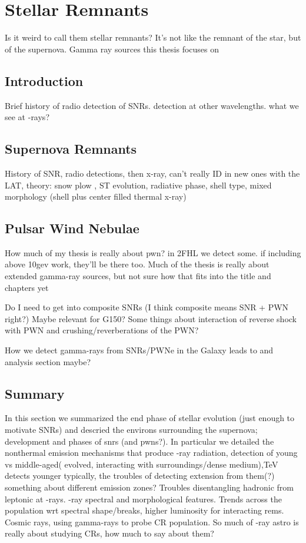 \chapter{Stellar Remnants}
\label{chap:Rems}
Is it weird to call them stellar remnants? It's not like the remnant of the star, but of the supernova. Gamma ray sources this thesis focuses on
\section{Introduction}\label{Rems:intro}
Brief history of radio detection of SNRs. detection at other wavelengths. what we see at \g-rays?
\section{Supernova Remnants}
History of SNR,  radio detections, then x-ray, can't really ID in new ones with the LAT, theory: snow plow , ST evolution, radiative phase, shell type, mixed morphology (shell plus center filled thermal x-ray) 
\section{Pulsar Wind Nebulae}
How much of my thesis is really about pwn? in 2FHL we detect some. if including above 10gev work, they'll be there too. Much of the thesis is really about extended gamma-ray sources, but not sure how that fits into the title and chapters yet

Do I need to get into composite SNRs (I think composite means SNR + PWN right?) Maybe relevant for G150? Some things about interaction of reverse shock with PWN and crushing/reverberations of the PWN?

How we detect gamma-rays from SNRs/PWNe in the Galaxy leads to and analysis section maybe?

\section{Summary}\label{Rems:summ} In this section we summarized the end phase of stellar evolution (just enough to motivate SNRs) and descried the environs surrounding the supernova; development and phases of \glspl{snr} (and \glspl{pwn}?).  In particular we detailed the nonthermal emission mechanisms that produce \g-ray radiation, detection of young vs middle-aged( evolved, interacting with surroundings/dense medium),TeV detects younger typically, the troubles of detecting extension from them(?) something about different emission zones? Troubles disentangling hadronic from leptonic at \g-rays. \g-ray spectral and morphological features. Trends across the population wrt spectral shape/breaks, higher luminosity for interacting rems. Cosmic rays, using gamma-rays to probe CR population. So much of \g-ray astro is really about studying CRs, how much to say about them? 